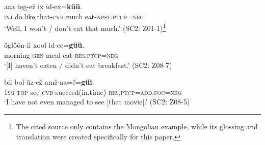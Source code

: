 \documentclass[output=paper,colorlinks,citecolor=brown,chinesefont]{langscibook}
\begin{document}
\ea\label{ex:kha:1}
    \gll aaa teg-ež ix id-ex=\textbf{küü}. \\ 
         \textsc{inj} do.like.that-\textsc{cvb} much eat-\textsc{npst.ptcp=neg} \\
    \glt ‘Well, I won’t / don’t eat that much.’ (SC2: Z01-1)\footnote{The cited source only contains the Mongolian example, while its glossing and translation were created specifically for this paper.}
\z 

\ea\label{ex:kha:2}
    \gll öglöön-ii xool id-ee=\textbf{güü}. \\ 
         morning-\textsc{gen} meal  eat-\textsc{res.ptcp=neg} \\
    \glt ‘[I] haven’t eaten / didn’t eat breakfast.’ (SC2: Z08-7)
\z 

\ea\label{ex:kha:3}
    \gll bii bol üz-ež amž-aa=č=\textbf{güi}. \\ 
         \textsc{1sg} \textsc{top} see-\textsc{cvb} succeed(in.time)-\textsc{res.ptcp=add.foc=neg} \\
    \glt ‘I have not even managed to see [that movie].’ (SC2: Z08-5)
\z 
\end{document}
